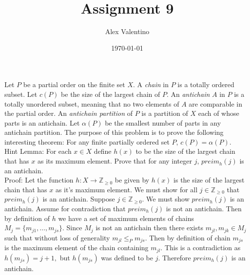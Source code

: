 \documentclass[12pt, letterpaper]{article}
\date{\today}
\author{Alex Valentino}
\title{Assignment 9}
\newcommand{\Z}{\mathbb{Z}}
\begin{document}
	Let $P$ be a partial order on the finite set $X$. A \emph{chain} in $P$ is a totally ordered subset.  Let $c(P)$ be the size of the largest chain of $P$.
An \emph{antichain} $A$ in $P$ is a totally unordered subset, meaning that no two elements of $A$ are comparable in the partial order.  An \emph{antichain partition} of $P$ is a partition of $X$ each of whose parts is an antichain.  Let $\alpha(P)$ be the smallest number of parts in any antichain partition.  The purpose of this problem is to prove the following interesting theorem: For any finite partially ordered set $P$, $c(P)=\alpha(P)$.\\


Hint Lemma: For each $x \in X$ define $h(x)$ to be the size of the largest chain that has $x$ as its maximum element.  
Prove that for any integer $j$, $preim_h(j)$ is an antichain. \\
	
Proof:  Let the function $h: X \to \Z_{\geq0}$ be given by $h(x)$ is the size of the largest chain that has $x$ as it's maximum element.  We must show for all $j \in \Z_{\geq 0}$ that $preim_h(j)$ is an antichain.  Suppose $j \in \Z_{\geq 0}$.  We must show $preim_h(j)$ is an antichain.  Assume for contradiction that $preim_h(j)$ is not an antichain.  Then by definition of $h$ we have a set of maximum elements of chains $M_j = \{m_{j1},\ldots,m_{js}\}$.  Since $M_j$ is not an antichain then there exists $m_{jl}, m_{jk} \in M_j$ such that without loss of generality $m_{jl} \leq_P m_{js}.$  Then by definition of chain $m_{js}$ is the maximum element of the chain containing $m_{jl}$. This is a contradiction as $h(m_{js}) = j+1,$ but $h(m_{js})$ was defined to be $j$.  Therefore $preim_h(j)$ is an antichain.\\
\end{document}
